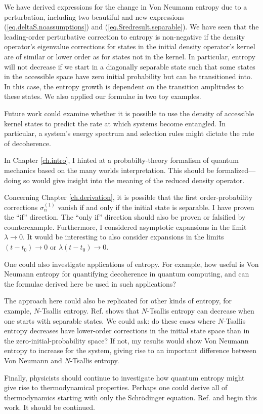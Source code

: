 We have derived expressions for the change in Von Neumann entropy due to a perturbation, including two beautiful and new expressions (\ref{eq.deltaS.noassumptions}) and (\ref{eq.Sredresult.separable}). We have seen that the leading-order perturbative correction to entropy is non-negative if the density operator's eigenvalue corrections for states in the initial density operator's kernel are of similar or lower order as for states not in the kernel. In particular, entropy will not decrease if we start in a diagonally separable state such that some states in the accessible space have zero initial probability but can be transitioned into. In this case, the entropy growth is dependent on the transition amplitudes to these states. We also applied our formulae in two toy examples.

Future work could examine whether it is possible to use the density of accessible kernel states to predict the rate at which systems become entangled. In particular, a system’s energy spectrum and selection rules might dictate the rate of decoherence.

In Chapter \ref{ch.intro}, I hinted at a probabilty-theory formalism of quantum mechanics based on the many worlds interpretation. This should be formalized---doing so would give insight into the meaning of the reduced density operator.

Concerning Chapter \ref{ch.derivation}, it is possible that the first order-probability corrections \(\sigma_n^{(1)}\) vanish if and only if the initial state is separable. I have proven the ``if'' direction. The ``only if'' direction should also be proven or falsified by counterexample. Furthermore, I considered asymptotic expansions in the limit \(\lambda \to 0\). It would be interesting to also consider expansions in the limits \(\left(t-t_0\right) \to 0\) or \(\lambda\left(t-t_0\right) \to 0\).

One could also investigate applications of entropy. For example, how useful is Von Neumann entropy for quantifying decoherence in quantum computing, and can the formulae derived here be used in such applications? 

The approach here could also be replicated for other kinds of entropy, for example, \(N\)-Tsallis entropy. Ref. \cite{cheung} shows that \(N\)-Tsallis entropy can decrease when one starts with separable states. We could ask: do these cases where \(N\)-Tsallis entropy decreases have lower-order corrections in the initial state space than in the zero-initial-probability space? If not, my results would show Von Neumann entropy to increase for the system, giving rise to an important difference between Von Neumann and \(N\)-Tsallis entropy.

Finally, physicists should continue to investigate how quantum entropy might give rise to thermodynamical properties. Perhaps one could derive all of thermodynamics starting with only the Schrödinger equation. Ref. \cite{bracken} and \cite{heusler} begin this work. It should be continued.
